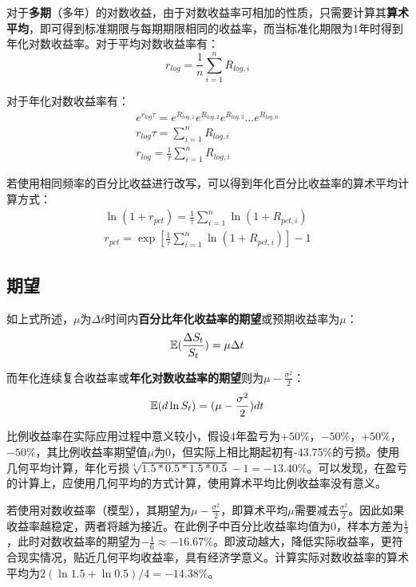\documentclass[11pt]{article}
\begin{document}
对于\textbf{多期}（多年）的对数收益，由于对数收益率可相加的性质，只需要计算其\textbf{算术平均}，即可得到标准期限与每期期限相同的收益率，而当标准化期限为1年时得到年化对数收益率。对于平均对数收益率有：
\begin{equation*}
    r_{log} = \frac{1}{n} \sum^{n}_{i=1} R_{log,i}    
\end{equation*}

对于年化对数收益率有：
\begin{gather*}
    e^{r_{log}\tau} = e^{R_{log,1}} e^{R_{log,2}} e^{R_{log,3}} \dots e^{R_{log,n}} \\
    r_{log}\tau = \sum^{n}_{i=1} R_{log,i} \\
    r_{log} = \frac{1}{\tau} \sum^{n}_{i=1} R_{log,i}    
\end{gather*}

若使用相同频率的百分比收益进行改写，可以得到年化百分比收益率的算术平均计算方式：
\begin{gather*}
    \ln (1 + r_{pct}) = \frac{1}{\tau} \sum^{n}_{i=1} \ln (1 + R_{pct,i}) \\
    r_{pct} = \exp \left[ \frac{1}{\tau} \sum^{n}_{i=1} \ln (1 + R_{pct,i}) \right] - 1
\end{gather*}

\subsection{期望}

如上式所述，$\mu$为$\Delta t$时间内\textbf{百分比年化收益率的期望}或预期收益率为$\mu$：
\begin{equation*}
    \mathbb{E}(\frac{\Delta S_t}{S_t}) = \mu \Delta t
\end{equation*}

而年化连续复合收益率或\textbf{年化对数收益率的期望}则为$\mu-\frac{\sigma^2}{2}$：
\begin{equation*}
    \mathbb{E}(d\ln S_t) = (\mu - \frac{\sigma^2}{2})dt
\end{equation*}

比例收益率在实际应用过程中意义较小，假设4年盈亏为$+50\%$，$-50\%$，$+50\%$，$-50\%$，其比例收益率期望值$\mu$为0，但实际上相比期起初有-43.75\%的亏损。使用几何平均计算，年化亏损$\sqrt[4]{1.5*0.5*1.5*0.5} - 1 = -13.40\%$。可以发现，在盈亏的计算上，应使用几何平均的方式计算，使用算术平均比例收益率没有意义。

若使用对数收益率（模型），其期望为$\mu-\frac{\sigma^2}{2}$，即算术平均$\mu$需要减去$\frac{\sigma^2}{2}$。因此如果收益率越稳定，两者将越为接近。在此例子中百分比收益率均值为0，样本方差为$\frac{1}{3}$，此时对数收益率的期望为$-\frac{1}{6}\approx -16.67\%$。即波动越大，降低实际收益率，更符合现实情况，贴近几何平均收益率，具有经济学意义。计算实际对数收益率的算术平均为$2(\ln 1.5 + \ln 0.5)/4 = -14.38\%$。
\end{document}
